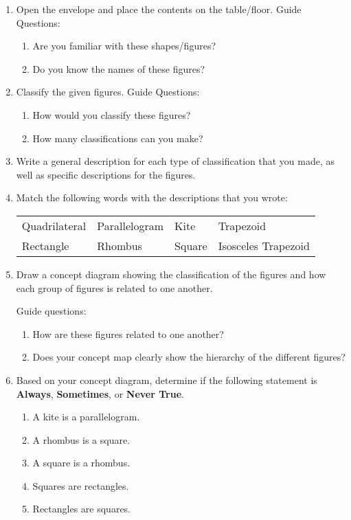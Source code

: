 \begin{enumerate}
\item Open the envelope and place the contents on the table/floor.
Guide Questions:
  \begin{enumerate}
	\item Are you familiar with these shapes/figures?
	\item Do you know the names of these figures?
	\end{enumerate}
\item Classify the given figures. Guide Questions:
	\begin{enumerate}
	\item How would you classify these figures?
	\item How many classifications can you make?
	\end{enumerate}
\item Write a general description for each type of classification that you made, as well as
specific descriptions for the figures.
\item Match the following words with the descriptions that you wrote:

\begin{tabular}{llll}
Quadrilateral & Parallelogram & Kite & Trapezoid\\
Rectangle & Rhombus & Square & Isosceles Trapezoid\\
\end{tabular}
\item Draw a concept diagram showing the classification of the figures and how each group of
figures is related to one another.

Guide questions:
\begin{enumerate}
\item How are these figures related to one another?
\item Does your concept map clearly show the hierarchy of the different figures?
\end{enumerate}
\item Based on your concept diagram, determine if the following statement is \textbf{Always},
\textbf{Sometimes}, or \textbf{Never True}.
\begin{enumerate}
\item A kite is a parallelogram.
\item A rhombus is a square.
\item A square is a rhombus.
\item Squares are rectangles.
\item Rectangles are squares.
\end{enumerate}
\end{enumerate}
